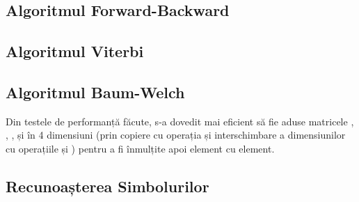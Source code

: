 \documentclass[12pt]{article}
\begin{document}
\subsection{Algoritmul Forward-Backward}
\label{sec:fb-sol}



\subsection{Algoritmul Viterbi}
\label{sec:viterbi-sol}



\subsection{Algoritmul Baum-Welch}
\label{sec:baum-welch-sol}

Din testele de performanță făcute, s-a dovedit mai eficient să fie
aduse matricele , , ,  și
 în 4 dimensiuni (prin copiere cu operația 
și interschimbare a dimensiunilor cu operațiile  și
) pentru a fi înmulțite apoi element cu element.



\subsection{Recunoașterea Simbolurilor}
\label{sec:symbol-recognition-sol}
\end{document}
